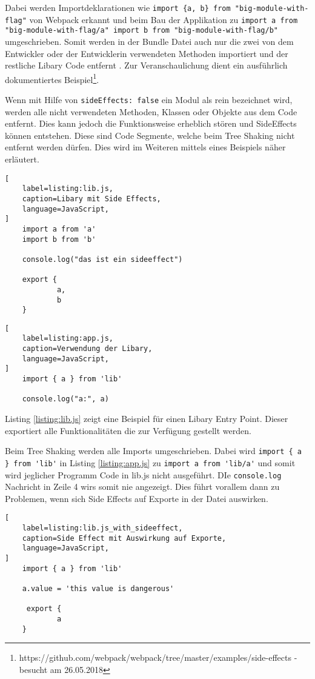 Dabei werden Importdeklarationen wie \lstinline|import {a, b} from "big-module-with-flag"| von Webpack erkannt und beim Bau der Applikation zu \lstinline|import a from "big-module-with-flag/a" import b from "big-module-with-flag/b"| umgeschrieben. Somit werden in der Bundle Datei auch nur die zwei von dem Entwickler oder der Entwicklerin verwendeten Methoden importiert und der restliche Libary Code entfernt \autocite{WebpackTreeShaking}. Zur Veranschaulichung dient ein ausführlich dokumentiertes Beispiel\footnote{https://github.com/webpack/webpack/tree/master/examples/side-effects - besucht am 26.05.2018}. 

Wenn mit Hilfe von \lstinline{sideEffects: false} ein Modul als rein bezeichnet wird, werden alle nicht verwendeten Methoden, Klassen oder Objekte aus dem Code entfernt. Dies kann jedoch die Funktionsweise erheblich stören und SideEffects können entstehen. Diese sind Code Segmente, welche beim Tree Shaking nicht entfernt werden dürfen. Dies wird im Weiteren mittels eines Beispiels näher erläutert.

\begin{lstlisting}[
    label=listing:lib.js,
	caption=Libary mit Side Effects,
	language=JavaScript,
]
	import a from 'a'
    import b from 'b'
    
    console.log("das ist ein sideeffect")
    
    export {
    		a,
    		b
    }
\end{lstlisting}

\begin{lstlisting}[
    label=listing:app.js,
	caption=Verwendung der Libary,
	language=JavaScript,
]
	import { a } from 'lib'
    
    console.log("a:", a)
\end{lstlisting}

Listing \ref{listing:lib.js} zeigt eine Beispiel für einen Libary Entry Point. Dieser exportiert alle Funktionalitäten die zur Verfügung gestellt werden.

Beim Tree Shaking werden alle Imports umgeschrieben. Dabei wird \lstinline|import { a } from 'lib'| in Listing \ref{listing:app.js} zu \lstinline{import a from 'lib/a'} und somit wird jeglicher Programm Code in lib.js nicht ausgeführt. DIe \lstinline{console.log} Nachricht in Zeile 4 wirs somit nie angezeigt. Dies führt vorallem dann zu Problemen, wenn sich Side Effects auf Exporte in der Datei auswirken. 

\begin{lstlisting}[
    label=listing:lib.js_with_sideeffect,
	caption=Side Effect mit Auswirkung auf Exporte,
	language=JavaScript,
]
	import { a } from 'lib'
    
	a.value = 'this value is dangerous'    
    
     export {
    		a
    }
\end{lstlisting}

